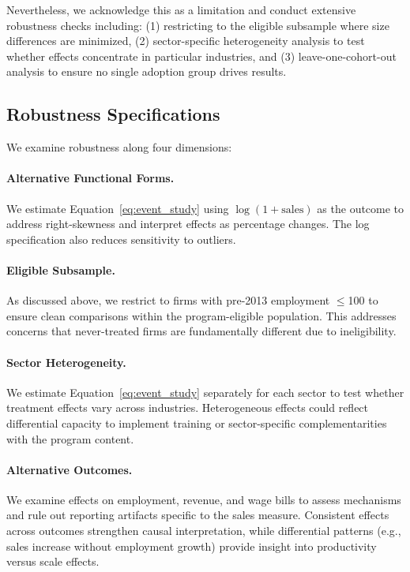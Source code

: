 \documentclass{article}
\begin{document}
Nevertheless, we acknowledge this as a limitation and conduct extensive robustness checks including: (1) restricting to the eligible subsample where size differences are minimized, (2) sector-specific heterogeneity analysis to test whether effects concentrate in particular industries, and (3) leave-one-cohort-out analysis to ensure no single adoption group drives results.

\subsection{Robustness Specifications}

We examine robustness along four dimensions:

\paragraph{Alternative Functional Forms.} We estimate Equation~\ref{eq:event_study} using $\log(1 + \text{sales})$ as the outcome to address right-skewness and interpret effects as percentage changes. The log specification also reduces sensitivity to outliers.

\paragraph{Eligible Subsample.} As discussed above, we restrict to firms with pre-2013 employment $\leq$100 to ensure clean comparisons within the program-eligible population. This addresses concerns that never-treated firms are fundamentally different due to ineligibility.

\paragraph{Sector Heterogeneity.} We estimate Equation~\ref{eq:event_study} separately for each sector to test whether treatment effects vary across industries. Heterogeneous effects could reflect differential capacity to implement training or sector-specific complementarities with the program content.

\paragraph{Alternative Outcomes.} We examine effects on employment, revenue, and wage bills to assess mechanisms and rule out reporting artifacts specific to the sales measure. Consistent effects across outcomes strengthen causal interpretation, while differential patterns (e.g., sales increase without employment growth) provide insight into productivity versus scale effects.
\end{document}
